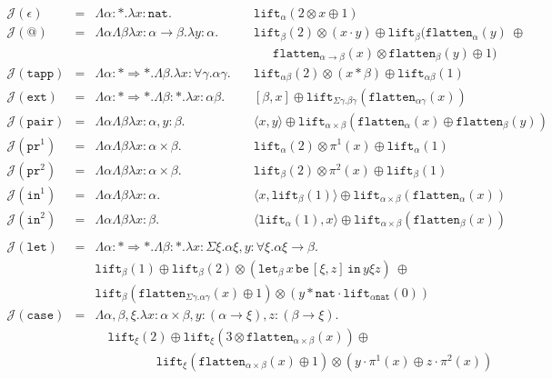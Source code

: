 \documentclass[a4paper,UKenglish,cleveref,autoref,numberwithinsect]{lipics-v2019}
\theoremstyle{definition}
\newcommand{\arrkind}{\Rightarrow}
\newcommand{\arrtype}{\rightarrow}
\newcommand{\quant}[2]{\forall #1.#2}
\newcommand{\pair}[2]{\langle #1,#2 \rangle}
\newcommand{\expair}[2]{[#1,#2]}
\newcommand{\nat}{\mathtt{nat}}
\newcommand{\flatten}{\mathtt{flatten}}
\newcommand{\lift}{\mathtt{lift}}
\newcommand{\Termmap}{\mathcal{J}}
\newcommand{\xlet}[4]{\mathtt{let}_{#1}\,#2\,\mathtt{be}\,[#3]\,\mathtt{in}\,#4}
\newcommand{\proj}{\mathtt{pr}}
\begin{document}
\[
\begin{array}{rcll}
\Termmap(\epsilon) & = & \Lambda \alpha:* . \lambda x:\nat. &
  \mathtt{lift}_\alpha(2 \otimes x \oplus 1) \\
\Termmap(@) & = & \Lambda\alpha\Lambda\beta\lambda x: \alpha \arrtype \beta . \lambda y :
  \alpha . \quad & \lift_\beta(2) \otimes (x \cdot y) \oplus
  \lift_\beta(\flatten_\alpha(y)\ \oplus \\
  & & & \phantom{AB}\flatten_{\alpha \arrtype \beta}(x) \otimes
  \flatten_\beta(y) \oplus 1) \\
\Termmap(\mathtt{tapp}) & = & \Lambda \alpha : * \arrkind * . \Lambda \beta . \lambda x : \quant{\gamma}{\alpha\gamma} . \quad &
  \lift_{\alpha\beta}(2) \otimes
  (x * \beta) \oplus \lift_{\alpha\beta}(1) \\
\Termmap(\mathtt{ext}) & = & \Lambda \alpha : * \arrkind * . \Lambda \beta : * . \lambda x:\alpha\beta . &
  \expair{\beta}{x} \oplus \lift_{\Sigma\gamma.\beta\gamma}(
  \flatten_{\alpha\gamma}(x)) \\
\Termmap(\mathtt{pair}) & = & \Lambda \alpha \Lambda \beta \lambda x :
  \alpha, y : \beta.\quad & \pair{x}{y} \oplus \lift_{
  \alpha \times \beta}(\flatten_\alpha(x) \oplus \flatten_{\beta}(y)) \\
\Termmap(\proj^1) & = & \Lambda \alpha \Lambda \beta \lambda x :
  \alpha \times \beta . \quad
  & \lift_\alpha(2) \otimes \pi^1(x) \oplus \lift_{\alpha}(1) \\
\Termmap(\proj^2) & = & \Lambda \alpha \Lambda \beta \lambda x :
  \alpha\times\beta.\quad
  & \lift_\beta(2) \otimes \pi^2(x) \oplus \lift_{\beta}(1) \\
\Termmap(\mathtt{in}^1) & = & \Lambda \alpha \Lambda \beta
  \lambda x : \alpha.\quad & \pair{x}{\lift_\beta(1)}
  \oplus \lift_{\alpha
  \times \beta}(\flatten_{\alpha}(x)) \\
\Termmap(\mathtt{in}^2) & = & \Lambda \alpha \Lambda \beta
  \lambda x : \beta.\quad & \pair{\lift_\alpha(1)}{x}
  \oplus \lift_{\alpha \times \beta}(\flatten_{\beta}(x)) \\
\end{array}
\]
\[
\begin{array}{rcl}
\Termmap(\mathtt{let}) & = & \Lambda \alpha : * \arrkind * . \Lambda \beta : * . \lambda x : \Sigma \xi . \alpha\xi,
  y : \quant{\xi}{\alpha\xi \arrtype \beta}. \\
  & & \lift_\beta(1) \oplus \lift_\beta(2) \otimes
    (\xlet{\beta}{x}{\xi,z}{y\xi z})\ \oplus \\
  & & \lift_\beta(\flatten_{\Sigma\gamma.\alpha\gamma}(x) \oplus 1)
    \otimes (y * \nat \cdot \lift_{\alpha\nat}(0)) \\
\Termmap(\mathtt{case}) & = & \Lambda \alpha,\beta,\xi . \lambda x :
  \alpha \times \beta, y : (\alpha \arrtype \xi), z : (\beta \arrtype
  \xi). \\
  & & \quad
  \lift_\xi(2) \oplus
  \lift_\xi(3 \otimes \flatten_{\alpha \times \beta}(x)) \oplus \\
  & & \quad\phantom{ABCDE}
  \lift_\xi(\flatten_{\alpha \times \beta}(x) \oplus 1)
    \otimes (y \cdot \pi^1(x) \oplus z \cdot \pi^2(x)) \\
\end{array}
\]
\end{document}
